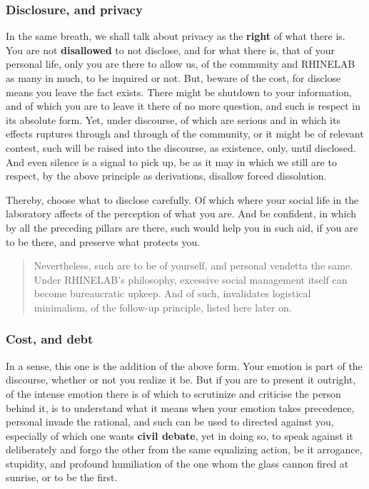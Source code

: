 \documentclass[10pt,a4paper]{article}
\begin{document}
\subsubsection{Disclosure, and privacy}

In the same breath, we shall talk about privacy as the \textbf{right} of what there is. You are not \textbf{disallowed} to not disclose, and for what there is, that of your personal life, only you are there to allow us, of the community and RHINELAB as many in much, to be inquired or not. But, beware of the cost, for disclose means you leave the fact exists. There might be shutdown to your information, and of which you are to leave it there of no more question, and such is respect in its absolute form. Yet, under discourse, of which are serious and in which its effects ruptures through and through of the community, or it might be of relevant contest, such will be raised into the discourse, as existence, only, until disclosed. And even silence is a signal to pick up, be as it may in which we still are to respect, by the above principle as derivations, disallow forced dissolution. 

Thereby, choose what to disclose carefully. Of which where your social life in the laboratory affects of the perception of what you are. And be confident, in which by all the preceding pillars are there, such would help you in such aid, if you are to be there, and preserve what protects you. 

\begin{quote}
    Nevertheless, such are to be of yourself, and personal vendetta the same. Under RHINELAB's philosophy, excessive social management itself can become bureaucratic upkeep. And of such, invalidates logistical minimalism, of the follow-up principle, listed here later on.  
\end{quote}

\subsubsection{Cost, and debt}

In a sense, this one is the addition of the above form. Your emotion is part of the discourse, whether or not you realize it be. But if you are to present it outright, of the intense emotion there is of which to scrutinize and criticise the person behind it, is to understand what it means when your emotion takes precedence, personal invade the rational, and such can be used to directed against you, especially of which one wants \textbf{civil debate}, yet in doing so, to speak against it deliberately and forgo the other from the same equalizing action, be it arrogance, stupidity, and profound humiliation of the one whom the glass cannon fired at sunrise, or to be the first. 
\end{document}
